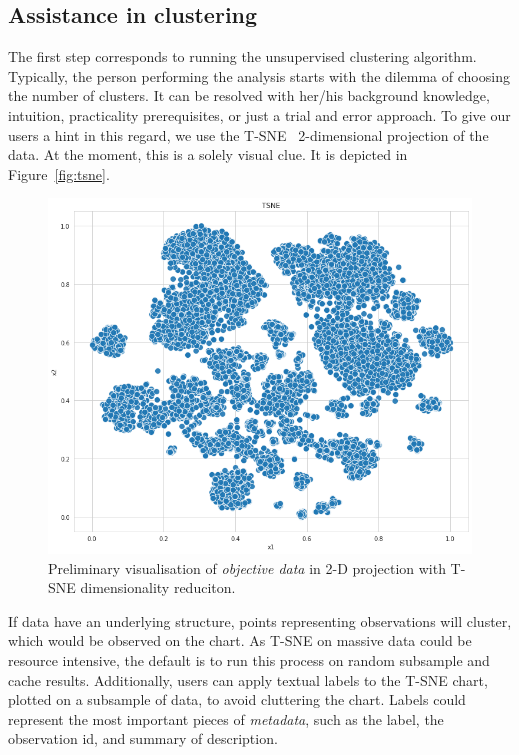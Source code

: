 \documentclass[
 twocolumn,
 hf,
]{ceurart}
\begin{document}
\subsection{Assistance in clustering}\label{subsec:assistance-in-clustering}
The first step corresponds to running the unsupervised clustering algorithm.
Typically, the person performing the analysis starts with the dilemma of choosing the number of clusters.
It can be resolved with her/his background knowledge, intuition, practicality prerequisites, or just a trial and error approach. %
To give our users a hint in this regard, we use the T-SNE~\cite{tsne} 2-dimensional projection of the data.
At the moment, this is a solely visual clue.
It is depicted in Figure~\ref{fig:tsne}.
\begin{figure}[h!]
  \centering
  \includegraphics[width=\linewidth]{example1-clustering-products-fashion-tex/output_57_1}
  \caption{Preliminary visualisation of \textit{objective data} in 2-D projection with T-SNE dimensionality reduciton.}
\end{figure}
If data have an underlying structure, points representing observations will cluster, which would be observed on the chart.
As T-SNE on massive data could be resource intensive, the default is to run this process on random subsample and cache results.
Additionally, users can apply textual labels to the T-SNE chart, plotted on a subsample of data, to avoid cluttering the chart. %
Labels could represent the most important pieces of \textit{metadata}, such as the label, the observation id, and summary of description.
\end{document}
